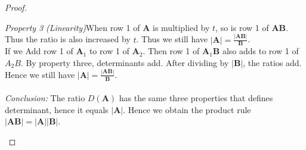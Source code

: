 \begin{enumerate}
\begin{proof}
\begin{itemize}
\emph{Property 3  }\textit{(Linearity)}\quad When row 1 of $\bm A$ is multiplied by $t$, so is row 1 of $\bm{AB}$. Thus the ratio is also increased by $t$. Thus we still have $|\bm A|=\frac{|\bm{AB}|}{\bm B}$.\\
If we Add row 1 of $\bm A_1$ to row 1 of $\bm A_2$. Then row 1 of $\bm A_1\bm B$ also adds to row 1 of $A_2B$. By property three, determinants add. After dividing by $|\bm B|$, the ratios add. Hence we still have $|\bm A|=\frac{|\bm{AB}|}{\bm B}$.\\\\
\textit{Conclusion: }The ratio $D(\bm A)$ has the same three properties that defines determinant, hence it equals $|\bm A|$. Hence we obtain the product rule $|\bm{AB}|=|\bm A||\bm B|$.\\
\end{itemize}
\end{proof}


\end{enumerate}
